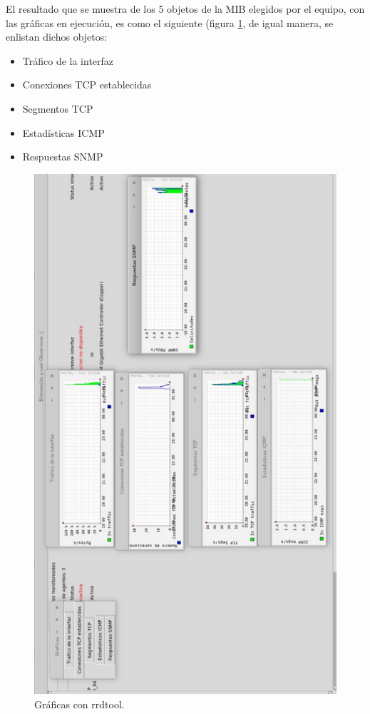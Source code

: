El resultado que se muestra de los 5 objetos de la MIB elegidos por el equipo, con las gráficas en ejecución, es como el siguiente (figura \ref{image:graficas}, de igual manera, se enlistan dichos objetos:
\begin{itemize}
\item Tráfico de la interfaz
\item Conexiones TCP establecidas
\item Segmentos TCP
\item Estadísticas ICMP
\item Respuestas SNMP
\end{itemize}
\FloatBarrier
\begin{figure}[htbp!]
		\centering			\includegraphics[width=.75 \textwidth]{images/graficas1}
		\caption{Gráficas con rrdtool.}
		\label{image:graficas}
\end{figure}
\FloatBarrier
